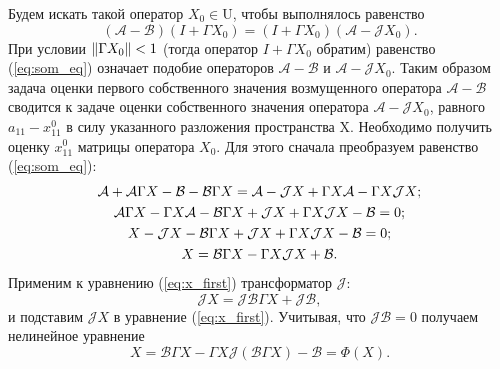 
Будем искать такой оператор $X_0 \in \mathrm{U}$, чтобы выполнялось равенство
\begin{equation}\label{eq:som_eq}
	(\mathcal{A}-\mathcal{B})(I + \Gamma X_0) = (I + \Gamma X_0)(\mathcal{A}-\mathcal{J}X_0).
\end{equation}
При условии $\left\|\Gamma X_0\right\| < 1$ (тогда оператор $I + \Gamma X_0$ обратим) равенство (\ref{eq:som_eq}) означает подобие операторов $\mathcal{A}-\mathcal{B}$ и $\mathcal{A}-\mathcal{J}X_0$. Таким образом задача оценки первого собственного значения возмущенного оператора $\mathcal{A}-\mathcal{B}$ сводится к задаче оценки собственного значения оператора $\mathcal{A}-\mathcal{J}X_0$, равного $a_{11} - x^{0}_{11}$ в силу указанного разложения пространства $\mathrm{X}$. Необходимо получить оценку $x^{0}_{11}$ матрицы оператора $X_0$. Для этого сначала преобразуем равенство (\ref{eq:som_eq}):
\begin{gather}
	\mathcal{A} + \mathcal{A} \Gamma X - \mathcal{B} - \mathcal{B} \Gamma X = \mathcal{A} - \mathcal{J} X + \Gamma X \mathcal{A} - \Gamma X \mathcal{J} X; \notag \\
	\mathcal{A} \Gamma X - \Gamma X \mathcal{A} - \mathcal{B} \Gamma X + \mathcal{J} X + \Gamma X \mathcal{J} X - \mathcal{B} = 0; \notag \\
	X - \mathcal{J} X - \mathcal{B} \Gamma X + \mathcal{J} X + \Gamma X \mathcal{J} X - \mathcal{B} = 0;  \notag \\
	X = \mathcal{B} \Gamma X - \Gamma X \mathcal{J} X + \mathcal{B}. \label{eq:x_first}
\end{gather}
Применим к уравнению (\ref{eq:x_first}) трансформатор $\mathcal{J}$:
$$
	\mathcal{J}X = \mathcal{J}\mathcal{B}\Gamma X + \mathcal{J}\mathcal{B},
$$ 
и подставим $\mathcal{J}X$ в уравнение (\ref{eq:x_first}). Учитывая, что $\mathcal{JB} = 0 $ получаем нелинейное уравнение
\begin{equation}\label{eq:x_main}
	X = \mathcal{B}\Gamma X - \Gamma X \mathcal{J}(\mathcal{B}\Gamma X) - \mathcal{B} = \Phi(X).
\end{equation}

